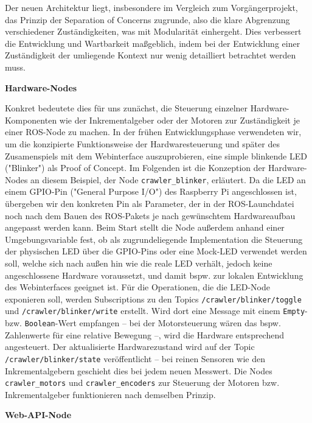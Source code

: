 Der neuen Architektur liegt, insbesondere im Vergleich zum Vorgängerprojekt, das Prinzip der Separation of Concerns zugrunde, also die klare Abgrenzung verschiedener Zuständigkeiten, was mit Modularität einhergeht. Dies verbessert die Entwicklung und Wartbarkeit maßgeblich, indem bei der Entwicklung einer Zuständigkeit der umliegende Kontext nur wenig detailliert betrachtet werden muss. 

\textbf{Hardware-Nodes}

Konkret bedeutete dies für uns zunächst, die Steuerung einzelner Hardware-Komponenten wie der Inkrementalgeber oder der Motoren zur Zuständigkeit je einer ROS-Node zu machen. In der frühen Entwicklungsphase verwendeten wir, um die konzipierte Funktionsweise der Hardwaresteuerung und später des Zusamenspiels mit dem Webinterface auszuprobieren, eine simple blinkende LED ("Blinker") als Proof of Concept. Im Folgenden ist die Konzeption der Hardware-Nodes an diesem Beispiel, der Node \texttt{crawler\_blinker}, erläutert. Da die LED an einem GPIO-Pin ("General Purpose I/O") des Raspberry Pi angeschlossen ist, übergeben wir den konkreten Pin als Parameter, der in der ROS-Launchdatei noch nach dem Bauen des ROS-Pakets je nach gewünschtem Hardwareaufbau angepasst werden kann. Beim Start stellt die Node außerdem anhand einer Umgebungsvariable fest, ob als zugrundeliegende Implementation die Steuerung der physischen LED über die GPIO-Pins oder eine Mock-LED verwendet werden soll, welche sich nach außen hin wie die reale LED verhält, jedoch keine angeschlossene Hardware voraussetzt, und damit bspw. zur lokalen Entwicklung des Webinterfaces geeignet ist. Für die Operationen, die die LED-Node exponieren soll, werden Subscriptions zu den Topics \texttt{/crawler/blinker/toggle} und \texttt{/crawler/blinker/write} erstellt. Wird dort eine Message mit einem \texttt{Empty}- bzw. \texttt{Boolean}-Wert empfangen -- bei der Motorsteuerung wären das bspw. Zahlenwerte für eine relative Bewegung --, wird die Hardware entsprechend angesteuert. Der aktualisierte Hardwarezustand wird auf der Topic \texttt{/crawler/blinker/state} veröffentlicht -- bei reinen Sensoren wie den Inkrementalgebern geschieht dies bei jedem neuen Messwert. Die Nodes \texttt{crawler\_motors} und \texttt{crawler\_encoders} zur Steuerung der Motoren bzw. Inkrementalgeber funktionieren nach demselben Prinzip.

\textbf{Web-API-Node}

